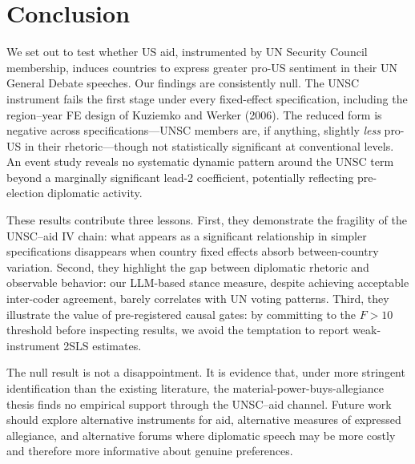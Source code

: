\section{Conclusion}\label{sec:conclusion}

We set out to test whether US aid, instrumented by UN Security Council membership, induces countries to express greater pro-US sentiment in their UN General Debate speeches. Our findings are consistently null. The UNSC instrument fails the first stage under every fixed-effect specification, including the region--year FE design of Kuziemko and Werker (2006). The reduced form is negative across specifications---UNSC members are, if anything, slightly \emph{less} pro-US in their rhetoric---though not statistically significant at conventional levels. An event study reveals no systematic dynamic pattern around the UNSC term beyond a marginally significant lead-2 coefficient, potentially reflecting pre-election diplomatic activity.

These results contribute three lessons. First, they demonstrate the fragility of the UNSC--aid IV chain: what appears as a significant relationship in simpler specifications disappears when country fixed effects absorb between-country variation. Second, they highlight the gap between diplomatic rhetoric and observable behavior: our LLM-based stance measure, despite achieving acceptable inter-coder agreement, barely correlates with UN voting patterns. Third, they illustrate the value of pre-registered causal gates: by committing to the $F>10$ threshold before inspecting results, we avoid the temptation to report weak-instrument 2SLS estimates.

The null result is not a disappointment. It is evidence that, under more stringent identification than the existing literature, the material-power-buys-allegiance thesis finds no empirical support through the UNSC--aid channel. Future work should explore alternative instruments for aid, alternative measures of expressed allegiance, and alternative forums where diplomatic speech may be more costly and therefore more informative about genuine preferences.
